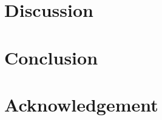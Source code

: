 \documentclass{article}
\begin{document}
\section{Discussion}
\section{Conclusion}
\section{Acknowledgement}




\end{document}
